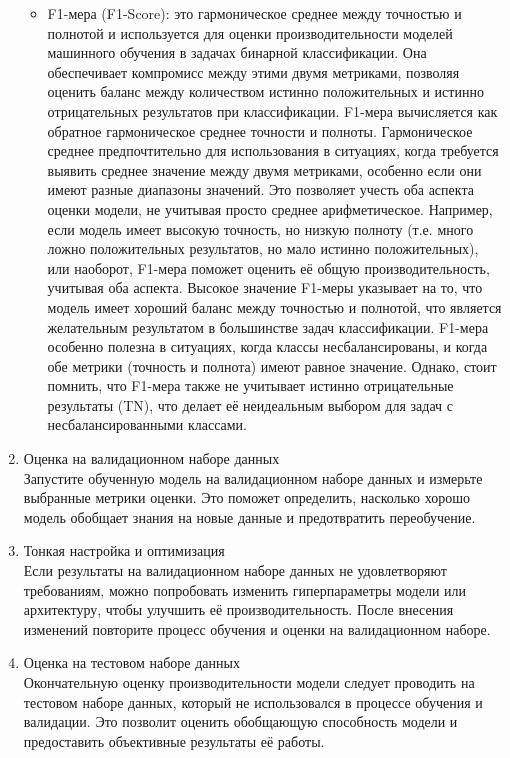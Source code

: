 \begin{enumerate}
\begin{itemize}
            \item F1-мера (F1-Score): это гармоническое среднее между точностью и полнотой и используется для оценки производительности моделей машинного обучения в задачах бинарной классификации. Она обеспечивает компромисс между этими двумя метриками, позволяя оценить баланс между количеством истинно положительных и истинно отрицательных результатов при классификации. F1-мера вычисляется как обратное гармоническое среднее точности и полноты. Гармоническое среднее предпочтительно для использования в ситуациях, когда требуется выявить среднее значение между двумя метриками, особенно если они имеют разные диапазоны значений. Это позволяет учесть оба аспекта оценки модели, не учитывая просто среднее арифметическое. Например, если модель имеет высокую точность, но низкую полноту (т.е. много ложно положительных результатов, но мало истинно положительных), или наоборот, F1-мера поможет оценить её общую производительность, учитывая оба аспекта. Высокое значение F1-меры указывает на то, что модель имеет хороший баланс между точностью и полнотой, что является желательным результатом в большинстве задач классификации. F1-мера особенно полезна в ситуациях, когда классы несбалансированы, и когда обе метрики (точность и полнота) имеют равное значение. Однако, стоит помнить, что F1-мера также не учитывает истинно отрицательные результаты (TN), что делает её неидеальным выбором для задач с несбалансированными классами.
        \end{itemize}
        
        \item Оценка на валидационном наборе данных \\
        Запустите обученную модель на валидационном наборе данных и измерьте выбранные метрики оценки. Это поможет определить, насколько хорошо модель обобщает знания на новые данные и предотвратить переобучение.
        
        \item Тонкая настройка и оптимизация \\
        Если результаты на валидационном наборе данных не удовлетворяют требованиям, можно попробовать изменить гиперпараметры модели или архитектуру, чтобы улучшить её производительность. После внесения изменений повторите процесс обучения и оценки на валидационном наборе.
        
        \item Оценка на тестовом наборе данных \\
        Окончательную оценку производительности модели следует проводить на тестовом наборе данных, который не использовался в процессе обучения и валидации. Это позволит оценить обобщающую способность модели и предоставить объективные результаты её работы.
        

\end{enumerate}
